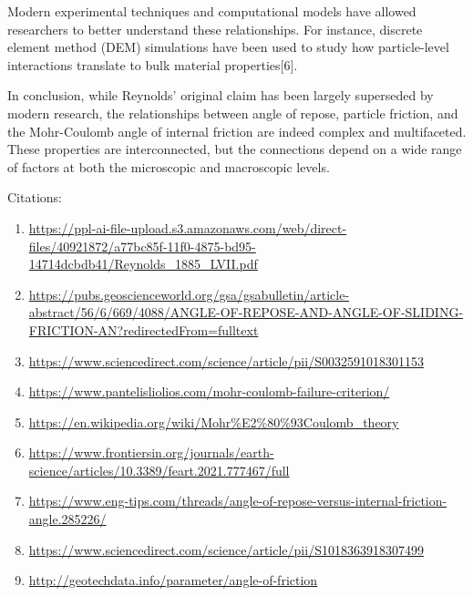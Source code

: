 \documentclass[xcolor=dvipsnames,10pt,hidelinks]{article}
\begin{document}
\begin{itemize}
Modern experimental techniques and computational models have allowed researchers to better understand these relationships. For instance, discrete element method (DEM) simulations have been used to study how particle-level interactions translate to bulk material properties[6].

In conclusion, while Reynolds' original claim has been largely superseded by modern research, the relationships between angle of repose, particle friction, and the Mohr-Coulomb angle of internal friction are indeed complex and multifaceted. These properties are interconnected, but the connections depend on a wide range of factors at both the microscopic and macroscopic levels.

Citations:
\begin{enumerate}
\item \url{https://ppl-ai-file-upload.s3.amazonaws.com/web/direct-files/40921872/a77bc85f-11f0-4875-bd95-14714dcbdb41/Reynolds\_1885\_LVII.pdf}
\item \url{https://pubs.geoscienceworld.org/gsa/gsabulletin/article-abstract/56/6/669/4088/ANGLE-OF-REPOSE-AND-ANGLE-OF-SLIDING-FRICTION-AN?redirectedFrom=fulltext}
\item \url{https://www.sciencedirect.com/science/article/pii/S0032591018301153}
\item \url{https://www.pantelisliolios.com/mohr-coulomb-failure-criterion/}
\item \url{https://en.wikipedia.org/wiki/Mohr\%E2\%80\%93Coulomb\_theory}
\item \url{https://www.frontiersin.org/journals/earth-science/articles/10.3389/feart.2021.777467/full}
\item \url{https://www.eng-tips.com/threads/angle-of-repose-versus-internal-friction-angle.285226/}
\item \url{https://www.sciencedirect.com/science/article/pii/S1018363918307499}
\item \url{http://geotechdata.info/parameter/angle-of-friction}
\end{enumerate}
\end{itemize}
\end{document}
